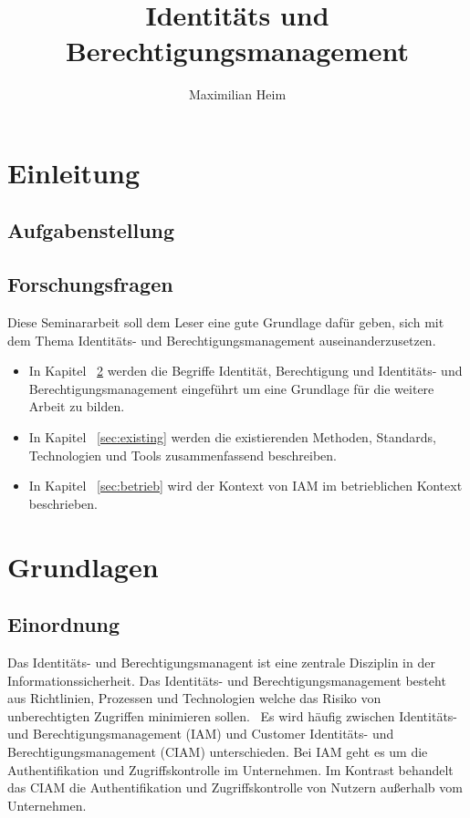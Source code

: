\documentclass[10pt]{article}
\author{Maximilian Heim}
\title{Identitäts und Berechtigungsmanagement}
\begin{document}
\maketitle
\newpage
\tableofcontents
\newpage
\section{Einleitung}
\subsection{Aufgabenstellung}
\subsection{Forschungsfragen}
Diese Seminararbeit soll dem Leser eine gute Grundlage dafür geben, sich mit dem Thema Identitäts- und Berechtigungsmanagement auseinanderzusetzen.
\begin{itemize}
  \item In Kapitel ~\cref{sec:grundlagen} werden die Begriffe Identität, Berechtigung und Identitäts- und Berechtigungsmanagement eingeführt um eine Grundlage für die weitere Arbeit zu bilden.
  \item In Kapitel ~\cref{sec:existing} werden die existierenden Methoden, Standards, Technologien und Tools zusammenfassend beschreiben.
  \item In Kapitel ~\cref{sec:betrieb} wird der Kontext von IAM im betrieblichen Kontext beschrieben.
\end{itemize}
\section{Grundlagen}
\label{sec:grundlagen}
\subsection{Einordnung}
Das Identitäts- und Berechtigungsmanagent ist eine zentrale Disziplin in der Informationssicherheit. Das Identitäts- und Berechtigungsmanagement besteht aus Richtlinien, Prozessen und Technologien welche das Risiko von unberechtigten Zugriffen minimieren sollen.~\cite{mohammed2017systematic} Es wird häufig zwischen Identitäts- und Berechtigungsmanagement (IAM) und Customer Identitäts- und Berechtigungsmanagement (CIAM) unterschieden. Bei IAM geht es um die Authentifikation und Zugriffskontrolle im Unternehmen. Im Kontrast behandelt das CIAM die Authentifikation und Zugriffskontrolle von Nutzern außerhalb vom Unternehmen.~\cite{mohammed2017systematic}~\cite{liveretos2022customer}
\end{document}
